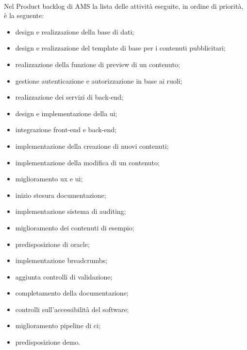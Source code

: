 \\Nel Product backlog di AMS la lista delle attività eseguite, in ordine di priorità, è la seguente:
\begin{itemize}
    \item design e realizzazione della base di dati;
    \item design e realizzazione del template di base per i contenuti pubblicitari;
    \item realizzazione della funzione di preview di un contenuto;   
    \item gestione autenticazione e autorizzazione in base ai ruoli;
    \item realizzazione dei servizi di back-end; 
    \item design e implementazione della \gls{ui}\glsfirstoccur{};
    \item integrazione front-end e back-end;
    \item implementazione della creazione di nuovi contenuti;
    \item implementazione della modifica di un contenuto;
    \item miglioramento \gls{ux}\glsfirstoccur{} e \gls{ui};
    \item inizio stesura documentazione;
    \item implementazione sistema di auditing;
    \item miglioramento dei contenuti di esempio;
    \item predisposizione di oracle;
    \item implementazione breadcrumbs;
    \item aggiunta controlli di validazione;
    \item completamento della documentazione;
    \item controlli sull'accessibilità del software;
    \item miglioramento pipeline di \gls{ci}\glsfirstoccur{};
    \item predisposizione demo.
\end{itemize}

